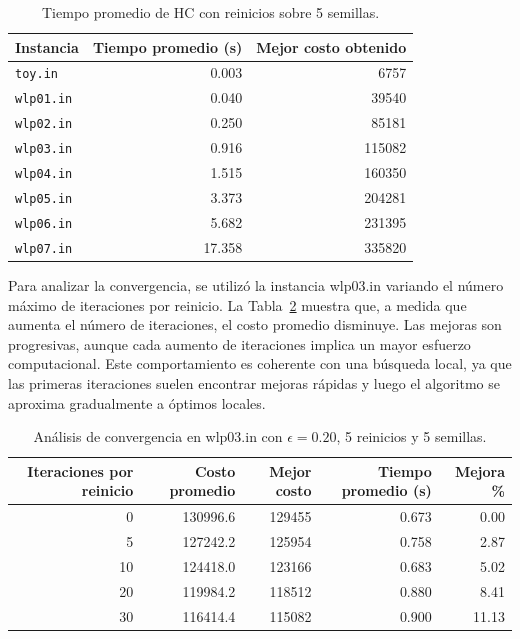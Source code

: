 \begin{table}[H]
\centering
\caption{Tiempo promedio de HC con reinicios sobre 5 semillas.}
\label{tab:tiempos}
\begin{tabular}{lrr}
\toprule
Instancia & Tiempo promedio (s) & Mejor costo obtenido \\
\midrule
\texttt{toy.in}   & 0.003  & 6757 \\
\texttt{wlp01.in} & 0.040  & 39540 \\
\texttt{wlp02.in} & 0.250  & 85181 \\
\texttt{wlp03.in} & 0.916  & 115082 \\
\texttt{wlp04.in} & 1.515  & 160350 \\
\texttt{wlp05.in} & 3.373  & 204281 \\
\texttt{wlp06.in} & 5.682  & 231395 \\
\texttt{wlp07.in} & 17.358 & 335820 \\
\bottomrule
\end{tabular}
\end{table}

\noindent Para analizar la convergencia, se utilizó la instancia wlp03.in variando el número máximo de iteraciones por reinicio. La Tabla~\ref{tab:convergencia} muestra que, a medida que aumenta el número de iteraciones, el costo promedio disminuye. Las mejoras son progresivas, aunque cada aumento de iteraciones implica un mayor esfuerzo computacional. Este comportamiento es coherente con una búsqueda local, ya que las primeras iteraciones suelen encontrar mejoras rápidas y luego el algoritmo se aproxima gradualmente a óptimos locales.

\begin{table}[H]
\centering
\caption{Análisis de convergencia en wlp03.in con \(\epsilon = 0.20\), 5 reinicios y 5 semillas.}
\label{tab:convergencia}
\begin{tabular}{rrrrr}
\toprule
Iteraciones por reinicio & Costo promedio & Mejor costo & Tiempo promedio (s) & Mejora \% \\
\midrule
0  & 130996.6 & 129455 & 0.673 & 0.00 \\
5  & 127242.2 & 125954 & 0.758 & 2.87 \\
10 & 124418.0 & 123166 & 0.683 & 5.02 \\
20 & 119984.2 & 118512 & 0.880 & 8.41 \\
30 & 116414.4 & 115082 & 0.900 & 11.13 \\
\bottomrule
\end{tabular}
\end{table}
